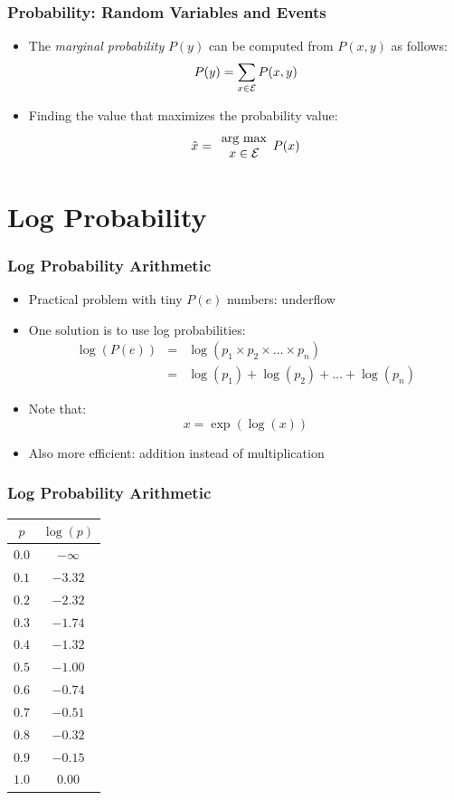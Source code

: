 \documentclass[handout]{beamer}
\newcommand{\argmax}[1]{\begin{array}{c}\mbox{arg max}\\#1\end{array}}
\begin{document}
\begin{frame}
\frametitle{Probability: Random Variables and Events}
\begin{itemize}[<+->]
\item The {\em marginal probability} $P(y)$ can be computed from $P(x,y)$ as
  follows:
\[ P(y) = \sum_{x \in {\cal E}} P(x,y) \]
\item Finding the value that maximizes the probability value:
\[ \hat{x} = \argmax{x \in {\cal E}} P(x) \]
\end{itemize}

\end{frame}

\section{Log Probability}
\frame{\tableofcontents[currentsection]}

\begin{frame}
\frametitle{Log Probability Arithmetic}
\begin{itemize}[<+->]
\item Practical problem with tiny $P(e)$ numbers: underflow
\item One solution is to use log probabilities:
\begin{eqnarray}
\log(P(e)) &=& \log(p_1 \times p_2 \times \ldots \times p_n) \nonumber
\\
&=& \log(p_1) + \log(p_2) + \ldots + \log(p_n) \nonumber
\end{eqnarray}
\item Note that: \[ x = \exp(\log(x)) \]
\item Also more efficient: addition instead of multiplication
\end{itemize}

\end{frame}

\begin{frame}
\frametitle{Log Probability Arithmetic}
\begin{center}
\begin{tabular}{|c|c|}
\hline
$p$ & $\log(p)$ \\
\hline
$0.0$ & $- \infty$ \\
$0.1$ & $-3.32$ \\
$0.2$ & $-2.32$ \\
$0.3$ & $-1.74$ \\
$0.4$ & $-1.32$ \\
$0.5$ & $-1.00$ \\
$0.6$ & $-0.74$ \\
$0.7$ & $-0.51$ \\
$0.8$ & $-0.32$ \\
$0.9$ & $-0.15$ \\
$1.0$ & $0.00$ \\
\hline
\end{tabular}
\end{center}

\end{frame}
\end{document}
